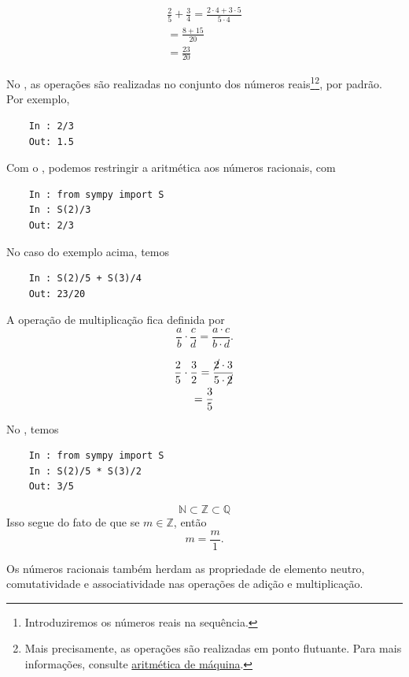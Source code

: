 \begin{ex}
  \begin{gather}
    \frac{2}{5} + \frac{3}{4} = \frac{2\cdot 4 + 3\cdot 5}{5\cdot 4} \\
    = \frac{8 + 15}{20} \\
    = \frac{23}{20}
  \end{gather}

  \ifispython
  No \python, as operações são realizadas no conjunto dos números reais\footnote{Introduziremos os números reais na sequência.}\footnote{Mais precisamente, as operações são realizadas em ponto flutuante. Para mais informações, consulte \href{https://phkonzen.github.io/notas/MatematicaNumerica/cap_aritm.html}{aritmética de máquina}.}, por padrão. Por exemplo,
  \begin{lstlisting}
    In : 2/3
    Out: 1.5
  \end{lstlisting}
  Com o \sympy, podemos restringir a aritmética aos números racionais, com
  \begin{lstlisting}
    In : from sympy import S
    In : S(2)/3
    Out: 2/3
  \end{lstlisting}
  No caso do exemplo acima, temos
  \begin{lstlisting}
    In : S(2)/5 + S(3)/4
    Out: 23/20
  \end{lstlisting}
  \fi
\end{ex}

A operação de multiplicação fica definida por
\begin{equation}
  \frac{a}{b}\cdot\frac{c}{d} = \frac{a\cdot c}{b\cdot d}.
\end{equation}

\begin{ex}
  \begin{gather}
    \frac{2}{5}\cdot\frac{3}{2} = \frac{\cancel{2}\cdot 3}{5\cdot \cancel{2}} \\
    = \frac{3}{5}
  \end{gather}

  \ifispython
  No \python, temos
  \begin{lstlisting}
    In : from sympy import S
    In : S(2)/5 * S(3)/2
    Out: 3/5
  \end{lstlisting}
  \fi
\end{ex}

\begin{obs}
  \begin{equation}
    \mathbb{N} \subset \mathbb{Z} \subset \mathbb{Q}
  \end{equation}
  Isso segue do fato de que se $m\in\mathbb{Z}$, então
  \begin{equation}
    m = \frac{m}{1}.
  \end{equation}
  
  Os números racionais também herdam as propriedade de elemento neutro, comutatividade e associatividade nas operações de adição e multiplicação.
\end{obs}

